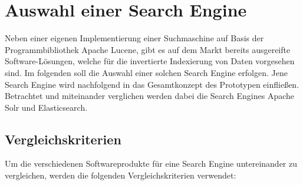 \section{Auswahl einer Search Engine\label{sec4.2:Unterpunkt-2}}

Neben einer eigenen Implementierung einer Suchmaschine auf Basis der Programmbibliothek \glqq Apache Lucene\grqq{}, gibt es auf dem Markt bereits ausgereifte Software-Lösungen, welche für die invertierte Indexierung von Daten vorgesehen sind. Im folgenden soll die Auswahl einer solchen Search Engine erfolgen. Jene Search Engine wird nachfolgend in das Gesamtkonzept des Prototypen einfließen. Betrachtet und miteinander verglichen werden dabei die Search Engines \glqq Apache Solr\grqq{} und \glqq Elasticsearch\grqq{}.

\subsection{Vergleichskriterien\label{subsec4.2.1:Unterunterpunkt-1}}

Um die verschiedenen Softwareprodukte für eine Search Engine untereinander zu vergleichen, werden die folgenden Vergleichskriterien verwendet:


